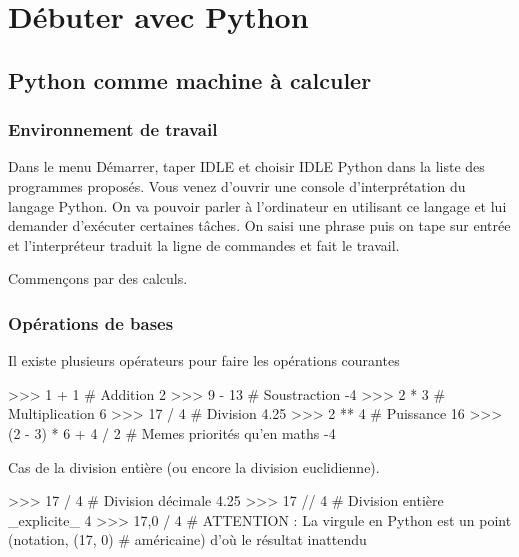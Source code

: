 
\chapter{Débuter avec Python}

\section{Python comme machine à calculer}

\subsection{Environnement de travail}

Dans le menu \textsf{Démarrer}, taper \og{} IDLE \fg{} et choisir \textsf{IDLE Python} dans la liste des programmes
proposés. Vous venez d'ouvrir une console d'interprétation du langage Python. On va pouvoir parler
à l'ordinateur en utilisant ce langage et lui demander d'exécuter certaines tâches.
On saisi une phrase puis on tape sur entrée et l'interpréteur traduit la ligne de commandes
et fait le travail.


Commençons par des calculs.

\subsection{Opérations de bases}
Il existe plusieurs opérateurs pour faire les opérations courantes

\begin{pythoncode}
>>> 1 + 1                  # Addition
2
>>> 9 - 13                 # Soustraction
-4
>>> 2 * 3                  # Multiplication
6
>>> 17 / 4                 # Division
4.25
>>> 2 ** 4                 # Puissance
16
>>> (2 - 3) * 6 + 4 / 2    # Memes priorités qu'en maths
-4
\end{pythoncode}

Cas de la division entière (ou encore la division euclidienne).

\begin{pythoncode}
>>> 17 / 4       # Division décimale
4.25
>>> 17 // 4      # Division entière _explicite_
4
>>> 17,0 / 4     # ATTENTION : La virgule en Python est un point (notation,
(17, 0)          # américaine) d'où le résultat inattendu
\end{pythoncode}

